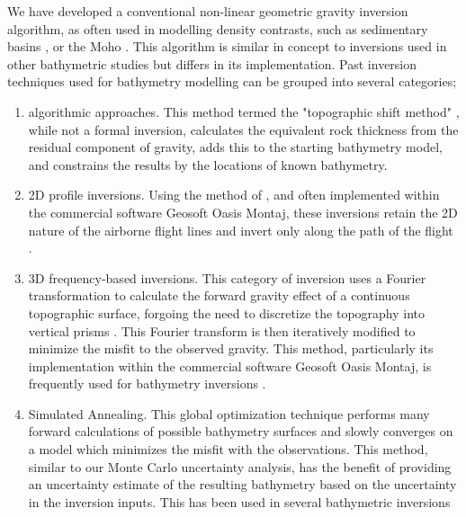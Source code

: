 We have developed a conventional non-linear geometric gravity inversion algorithm, as often used in modelling density contrasts, such as sedimentary basins \citep[e.g.,][]{martinssimultaneous2010, santosefficient2015}, or the Moho \citep[e.g.,][]{uiedafast2017, pappamoho2019}. This algorithm is similar in concept to inversions used in other bathymetric studies but differs in its implementation. Past inversion techniques used for bathymetry modelling can be grouped into several categories;
\begin{enumerate}
    \item algorithmic approaches. This method termed the "topographic shift method" \citep{hodgsonfuture2019, jordannew2020}, while not a formal inversion, calculates the equivalent rock thickness from the residual component of gravity, adds this to the starting bathymetry model, and constrains the results by the locations of known bathymetry.
    
    \item 2D profile inversions. Using the method of \citet{talwanirapid1959}, and often implemented within the commercial software Geosoft Oasis Montaj, these inversions retain the 2D nature of the airborne flight lines and invert only along the path of the flight \citep{tintobathymetry2015, cochranbathymetric2014, weigetz2020, boghosianresolving2015, cochrandetailed2020, tintoprogressive2011, constantinocook2023}.
    
    \item 3D frequency-based inversions. This category of inversion uses a Fourier transformation to calculate the forward gravity effect of a continuous topographic surface, forgoing the need to discretize the topography into vertical prisms \citep{parkerrapid1972, oldenburginversion1974}. This Fourier transform is then iteratively modified to minimize the misfit to the observed gravity. This method, particularly its implementation within the commercial software Geosoft Oasis Montaj, is frequently used for bathymetry inversions \citep{anbathymetry2019a, anbathymetry2019, anbed2017, greenbaumocean2015, millanconstraining2020, eisermannbathymetry2020, cochraninversion2012, millanvulnerability2018, millanbathymetry2017, studingerestimating2004, eisermannbathymetric2021}.
    
    \item Simulated Annealing. This global optimization technique \citep{kirkpatrickoptimization1983} performs many forward calculations of possible bathymetry surfaces and slowly converges on a model which minimizes the misfit with the observations. This method, similar to our Monte Carlo uncertainty analysis, has the benefit of providing an uncertainty estimate of the resulting bathymetry based on the uncertainty in the inversion inputs. This has been used in several bathymetric inversions \citep{royinversion2005, mutosubglacial2013, mutosubglacial2016, yangocean2020, yangbathymetry2021, yangseafloor2018, filinanew2008}


\end{enumerate}

